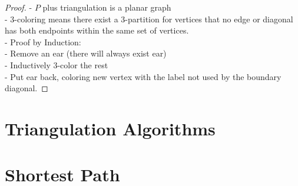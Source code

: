 			\begin{proof}
				- $P$ plus triangulation is a planar graph\\
				- 3-coloring means there exist a 3-partition for vertices that no edge or diagonal has both endpoints within the same set of vertices.\\
				- Proof by Induction:\\
				\indent - Remove an ear (there will always exist ear) \\
				\indent - Inductively 3-color the rest\\
				\indent - Put ear back, coloring new vertex with the label not used by the boundary diagonal.
			\end{proof}

		\section{Triangulation Algorithms}

		\section{Shortest Path}


